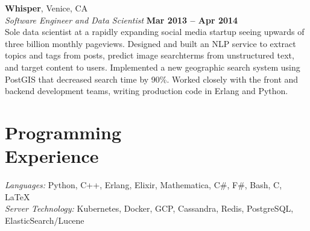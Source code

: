 \documentclass[margin,line]{resume}
\begin{document}
\begin{resume}
    \textbf{Whisper}, Venice, CA \vspace{2mm}\\\vspace{1mm}%
    \textsl{Software Engineer and Data Scientist} \hfill \textbf{Mar 2013 -- Apr 2014}\\
    Sole data scientist at a rapidly expanding social media startup
    seeing upwards of three billion monthly pageviews. Designed and built an NLP
    service to extract topics and tags from posts, predict image searchterms
    from unstructured text, and target content to users. Implemented a new
    geographic search system using PostGIS that decreased search time by
    90\%. Worked closely with the front and backend development teams, writing
    production code in Erlang and Python.


    \section{\mysidestyle Programming\\Experience}

    \emph{Languages:} Python, C++, Erlang, Elixir, Mathematica,  C\#, F\#, Bash, C, \LaTeX \\
    \emph{Server Technology:} Kubernetes, Docker, GCP, Cassandra, Redis, PostgreSQL, ElasticSearch/Lucene
\end{resume}
\end{document}
